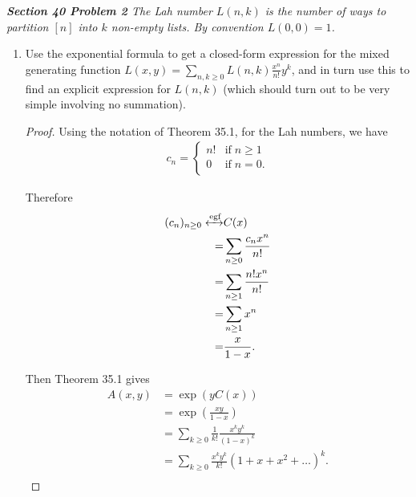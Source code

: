 \documentclass{article}
\begin{document}
\it \textbf{Section 40 Problem 2} The Lah number $L(n,k)$ is the number of
  ways to partition $[n]$ into $k$ non-empty lists. By convention
  $L(0,0)=1$.

  \begin{enumerate}[label={(\alph*)}]
    \item Use the exponential formula to get a closed-form expression for
      the mixed generating function $L(x,y) =\sum_{n,k\geq0} L(n,k)
      \frac{x^n}{n!} y^k$, and in turn use this to find an explicit
      expression for $L(n,k)$ (which should turn out to be very simple
      involving no summation). \label{qn:Lah}

      \begin{proof}
        Using the notation of Theorem 35.1, for the Lah numbers, we have
        \begin{align*}
          c_n =
          \begin{cases}
            n! &\text{if}\; n\geq1\\
            0 &\text{if}\; n=0.\\
          \end{cases}
        \end{align*}

        Therefore
        \begin{align*}
          (c_n)_{n\geq0}\xleftrightarrow{\text{egf}} &C(x)\\
          =&\sum_{n\geq0} \frac{c_nx^n}{n!}\\
          =&\sum_{n\geq1} \frac{n!x^n}{n!}\\
          =&\sum_{n\geq1} x^n\\
          =&\frac{x}{1-x}.\\
        \end{align*}

        Then Theorem 35.1 gives
        \begin{align*}
          A(x,y) &=\exp{\left(yC(x)\right)}\\
          &=\exp{\left(\frac{xy}{1-x} \right)}\\
          &=\sum_{k\geq0} \frac{1}{k!} \frac{x^ky^k}{(1-x)^k}\\
          &=\sum_{k\geq0} \frac{x^ky^k}{k!} (1+x+x^2+\ldots)^k.\\
        \end{align*}


\end{proof}
\end{enumerate}
\end{document}
